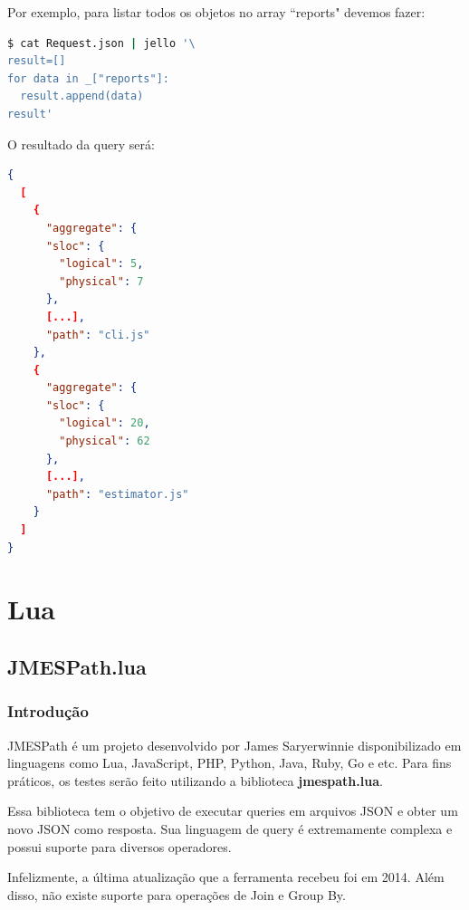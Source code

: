 \documentclass[a4paper, 12pt] {article}
\begin{document}
				Por exemplo, para listar todos os objetos no array “reports" devemos fazer:
\begin{lstlisting}[language=bash]
$ cat Request.json | jello '\
result=[]
for data in _["reports"]:
  result.append(data)
result'
\end{lstlisting}

				\newpage O resultado da query será:
\begin{lstlisting}[language=json,firstnumber=1]
{
  [
    {
      "aggregate": {
      "sloc": {
        "logical": 5,
        "physical": 7
      },
      [...],
      "path": "cli.js"
    },
    {
      "aggregate": {
      "sloc": {
        "logical": 20,
        "physical": 62
      },
      [...],
      "path": "estimator.js"
    }
  ]
}
\end{lstlisting}
	\newpage \section{Lua}
		\subsection{JMESPath.lua}
			\subsubsection{Introdução}
				JMESPath é um projeto desenvolvido por James Saryerwinnie disponibilizado em linguagens como Lua, JavaScript, PHP, Python, Java, Ruby, Go e etc. Para fins práticos, os testes serão feito utilizando a biblioteca \textbf{jmespath.lua}.

				Essa biblioteca tem o objetivo de executar queries em arquivos JSON e obter um novo JSON como resposta. Sua linguagem de query é extremamente complexa e possui suporte para diversos operadores.

				Infelizmente, a última atualização que a ferramenta recebeu foi em 2014. Além disso, não existe suporte para operações de Join e Group By.
\end{document}
